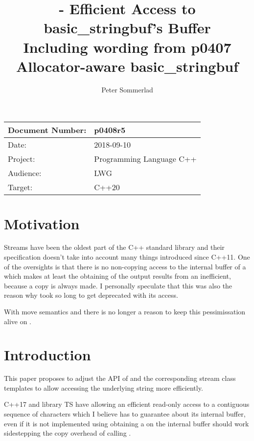 \documentclass[ebook,11pt,article]{memoir}
\title{\papernumber{} - Efficient Access to basic\_stringbuf's Buffer\\
Including wording from p0407 Allocator-aware basic\_stringbuf}
\author{Peter Sommerlad}
\date{\paperdate}                        %
\newcommand{\papernumber}{p0408r5}
\newcommand{\paperdate}{2018-09-10}
\begin{document}
\maketitle
\begin{tabular}[t]{|l|l|}\hline 
Document Number: & \papernumber  \\\hline
Date: & \paperdate \\\hline
Project: & Programming Language C++\\\hline 
Audience: & LWG\\\hline
Target: & C++20\\\hline
\end{tabular}

\chapter{Motivation}
Streams have been the oldest part of the C++ standard library and their specification doesn't take into account many things introduced since C++11. One of  the oversights is that there is no non-copying access to the internal buffer of a  which makes at least the obtaining of the output results from an  inefficient, because a copy is always made. I personally speculate that this was also the reason why  took so long to get deprecated with its  access.

With move semantics and  there is no longer a reason to keep this pessimissation alive on .


\chapter{Introduction}
This paper proposes to adjust the API of  and the corresponding stream class templates to allow accessing the underlying string more efficiently.

C++17 and library TS have  allowing an efficient read-only access to a contiguous sequence of characters which I believe  has to guarantee about its internal buffer, even if it is not implemented using  obtaining a  on the internal buffer should work sidestepping the copy overhead of calling . 
\end{document}
